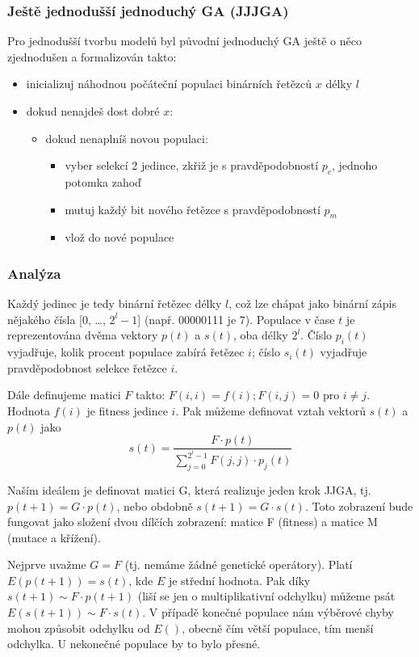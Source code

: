 \subsubsection{Ještě jednodušší jednoduchý GA (JJJGA)}
Pro jednodušší tvorbu modelů byl původní jednoduchý GA ještě o něco zjednodušen a formalizován takto:
\begin{itemize}
	
	
	\item inicializuj náhodnou počáteční populaci binárních řetězců $x$ délky $l$
	\item dokud nenajdeš dost dobré $x$:
	\begin{itemize}
		
		
		\item dokud nenaplníš novou populaci:
		\begin{itemize}
			
			
			\item vyber selekcí 2 jedince, zkřiž je s pravděpodobností $p_c$, jednoho potomka zahoď
			\item mutuj každý bit nového řetězce s pravděpodobností $p_m$
			\item vlož do nové populace
		\end{itemize}
	\end{itemize}
\end{itemize}

\subsubsection{Analýza}
Každý jedinec je tedy binární řetězec délky $l$, což lze chápat jako binární zápis nějakého čísla [0, \dots, $2^l-1$] (např. 00000111 je 7). Populace v čase $t$ je reprezentována dvěma vektory $p(t)$ a $s(t)$, oba délky $2^l$. Číslo $p_i(t)$ vyjadřuje, kolik procent populace zabírá řetězec $i$; číslo $s_i(t)$ vyjadřuje pravděpodobnost selekce řetězce $i$.

Dále definujeme matici $F$ takto: $F(i,i) = f(i); F(i,j) = 0$ pro $i \neq j$. Hodnota $f(i)$ je fitness jedince $i$. Pak můžeme definovat vztah vektorů $s(t)$ a $p(t)$ jako
$$s(t) = \frac{F \cdot p(t)}{\sum\limits_{j=0}^{2^l-1} F(j,j) \cdot p_j(t)}$$

Naším ideálem je definovat matici G, která realizuje jeden krok JJGA, tj. $p(t+1) = G \cdot p(t)$, nebo obdobně $s(t+1) = G \cdot s(t)$. Toto zobrazení bude fungovat jako složení dvou dílčích zobrazení: matice F (fitness) a matice M (mutace a křížení). 

Nejprve uvažme $G=F$ (tj. nemáme žádné genetické operátory). Platí $E(p(t+1)) = s(t)$, kde $E$ je střední hodnota. Pak díky $s(t+1) \sim F \cdot p(t+1)$ (liší se jen o multiplikativní odchylku) můžeme psát $E(s(t+1)) \sim F \cdot s(t)$. V případě konečné populace nám výběrové chyby mohou způsobit odchylku od $E()$, obecně čím větší populace, tím menší odchylka. U nekonečné populace by to bylo přesné.

